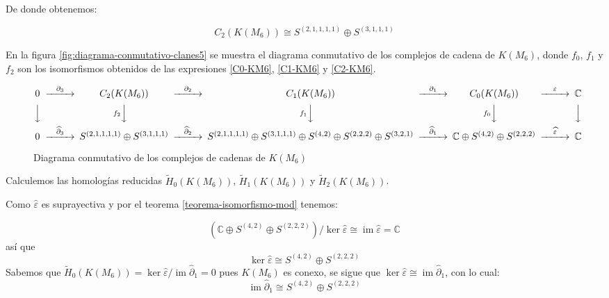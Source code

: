 \documentclass[12pt]{book}
\theoremstyle{definition}
\DeclareMathOperator{\im}{im}
\newcounter{in}
\begin{document}
De donde obtenemos:

\begin{equation}
  C_{2}(K(M_{6}))\cong S^{(2,1,1,1,1)}\oplus S^{(3,1,1,1)}
  \label{C2-KM6}
\end{equation}

En la figura \ref{fig:diagrama-conmutativo-clanes5} se muestra el diagrama
conmutativo de los complejos de cadena de $K(M_{6})$, donde $f_{0}$,
$f_{1}$ y $f_{2}$ son los isomorfismos obtenidos de las expresiones
\ref{C0-KM6}, \ref{C1-KM6} y \ref{C2-KM6}.

\begin{sidewaysfigure}%
  {\small
    \[
    \begin{CD}
      0 @>{\partial_{3}}>> C_{2}(K(M_{6})) @>{\partial_{2}}>> C_{1}(K(M_{6})) @>{\partial_{1}}>> C_{0}(K(M_{6})) @>{\varepsilon}>> \mathbb{C}\\
      @VVV   @Vf_{2}VV   @Vf_{1}VV   @Vf_{0}VV   @VVV    \\
      0  @>{\widehat\partial_{3}}>> S^{(2,1,1,1,1)}\oplus S^{(3,1,1,1)} @>{\widehat\partial_{2}}>>
      S^{(2,1,1,1,1)}\oplus S^{(3,1,1,1)}\oplus S^{(4,2)}\oplus
      S^{(2,2,2)}\oplus S^{(3,2,1)} @>{\widehat\partial_{1}}>>
      \mathbb{C} \oplus S^{(4,2)}\oplus S^{(2,2,2)} @>{\widehat
        \varepsilon}>> \mathbb{C}
    \end{CD}
    \]
  }
  
  \caption{Diagrama conmutativo de los complejos de cadenas de $K(M_{6})$}
  \label{fig:diagrama-conmutativo-clanes6}
\end{sidewaysfigure}

Calculemos las homologías reducidas $\widetilde H_{0}(K(M_{6}))$,
$\widetilde H_{1}(K(M_{6}))$ y $\widetilde H_{2}(K(M_{6}))$.

Como $\widehat\varepsilon$ es suprayectiva y por el teorema
\ref{teorema-isomorfismo-mod} tenemos:

\begin{equation*}
  (\mathbb{C} \oplus S^{(4,2)}\oplus S^{(2,2,2)})/\ker\widehat\varepsilon\cong \im \widehat\varepsilon=\mathbb{C}
\end{equation*}
así que
\begin{equation*}
  \label{ker0-KM6}
  \ker\widehat\varepsilon\cong S^{(4,2)}\oplus S^{(2,2,2)}
\end{equation*}
Sabemos que $\widetilde H_{0}(K(M_{6}))=\ker \widehat\varepsilon/\im
\widehat\partial_{1}=0$ pues $K(M_{6})$ es conexo, se sigue que $\ker \widehat\varepsilon\cong
\im\widehat\partial_{1}$, con lo cual:
\begin{equation}
  \label{im1-KM6}
  \im \widehat\partial_{1}\cong S^{(4,2)}\oplus S^{(2,2,2)}
\end{equation}
\end{document}
